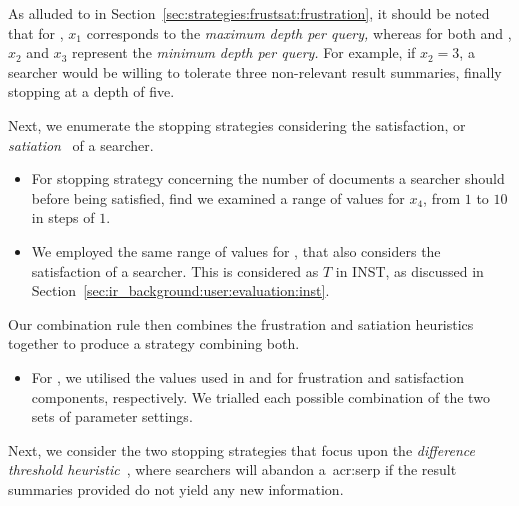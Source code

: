 As alluded to in Section~\ref{sec:strategies:frustsat:frustration}, it should be noted that for , $x_1$ corresponds to the \emph{maximum depth per query,} whereas for both  and , $x_2$ and $x_3$ represent the \emph{minimum depth per query.} For example, if $x_2=3$, a searcher would be willing to tolerate three non-relevant result summaries, finally stopping at a depth of five.

Next, we enumerate the stopping strategies considering the satisfaction, or \emph{satiation}~\citep{simon1955satiation} of a searcher.

\begin{itemize}
    
    \item{For stopping strategy  concerning the number of documents a searcher should before being satisfied, find we examined a range of values for $x_4$, from $1$ to $10$ in steps of $1$.}
    
    \item{We employed the same range of values for , that also considers the satisfaction of a searcher. This is considered as $T$ in INST, as discussed in Section~\ref{sec:ir_background:user:evaluation:inst}.}
    
\end{itemize}

Our combination rule then combines the frustration and satiation heuristics together to produce a strategy combining both.

\begin{itemize}
    
    \item{For , we utilised the values used in  and  for frustration and satisfaction components, respectively. We trialled each possible combination of the two sets of parameter settings.}
    
\end{itemize}

Next, we consider the two stopping strategies that focus upon the \emph{difference threshold heuristic}~\citep{nickles1995judgment}, where searchers will abandon a~\gls{acr:serp} if the result summaries provided do not yield any new information.

